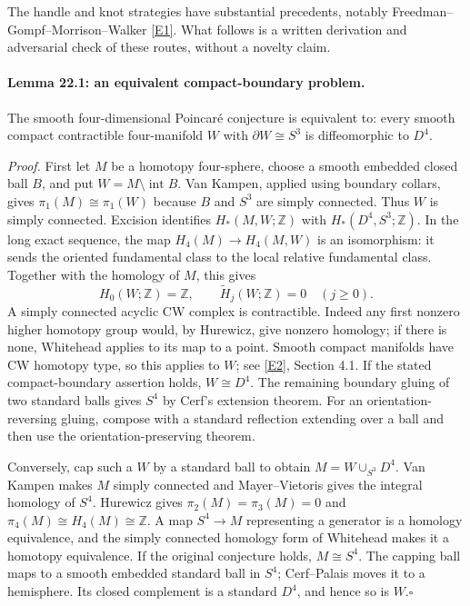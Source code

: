 \documentclass[11pt]{article}
\begin{document}
The handle and knot strategies have substantial precedents, notably
Freedman--Gompf--Morrison--Walker \href{https://arxiv.org/pdf/0906.5177}{[E1]}. What follows is a written derivation
and adversarial check of these routes, without a novelty claim.

\paragraph{Lemma 22.1: an equivalent compact-boundary problem.}
The smooth four-dimensional Poincar\'e conjecture is equivalent to:
every smooth compact contractible four-manifold $W$ with
$\partial W\cong S^3$ is diffeomorphic to $D^4$.

\emph{Proof.} First let $M$ be a homotopy four-sphere, choose a smooth
embedded closed ball $B$, and put $W=M\setminus\operatorname{int}B$.
Van Kampen, applied using boundary collars, gives
$\pi_1(M)\cong\pi_1(W)$ because $B$ and $S^3$ are simply connected.
Thus $W$ is simply connected. Excision identifies
$H_*(M,W;\mathbb Z)$ with $H_*(D^4,S^3;\mathbb Z)$. In the long exact
sequence, the map $H_4(M)\to H_4(M,W)$ is an isomorphism: it sends the
oriented fundamental class to the local relative fundamental class.
Together with the homology of $M$, this gives
\[
 H_0(W;\mathbb Z)=\mathbb Z,\qquad
 \widetilde H_j(W;\mathbb Z)=0\quad(j\ge0).
\]
A simply connected acyclic CW complex is contractible. Indeed any first
nonzero higher homotopy group would, by Hurewicz, give nonzero homology;
if there is none, Whitehead applies to its map to a point. Smooth compact
manifolds have CW homotopy type, so this applies to $W$; see \href{https://pi.math.cornell.edu/~hatcher/AT/ATch4.pdf}{[E2]},
Section 4.1. If the stated compact-boundary assertion holds, $W\cong D^4$.
The remaining boundary gluing of two standard balls gives $S^4$ by
Cerf's extension theorem. For an orientation-reversing gluing, compose
with a standard reflection extending over a ball and then use the
orientation-preserving theorem.

Conversely, cap such a $W$ by a standard ball to obtain
$M=W\cup_{S^3}D^4$. Van Kampen makes $M$ simply connected and
Mayer--Vietoris gives the integral homology of $S^4$. Hurewicz gives
$\pi_2(M)=\pi_3(M)=0$ and $\pi_4(M)\cong H_4(M)\cong\mathbb Z$.
A map $S^4\to M$ representing a generator is a homology equivalence,
and the simply connected homology form of Whitehead makes it a homotopy
equivalence. If the original conjecture holds, $M\cong S^4$. The
capping ball maps to a smooth embedded standard ball in $S^4$;
Cerf--Palais moves it to a hemisphere. Its closed complement is a
standard $D^4$, and hence so is $W$.\hfill$\square$
\end{document}
